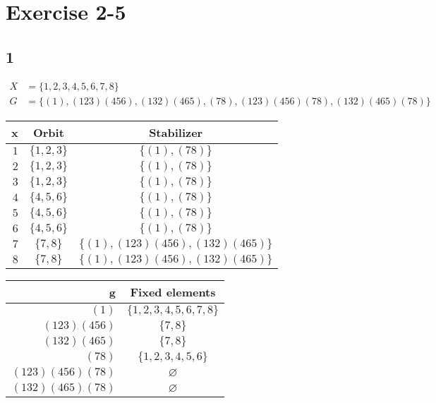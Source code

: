 \documentclass[draft]{article}
\begin{document}
	\section*{Exercise 2-5}
		\subsection*{1}
			\begin{equation*} 
				\begin{split}
					X &= \{ 1, 2, 3, 4, 5, 6, 7, 8 \}	\\
					G &= \{ (1), (123)(456), (132)(465), (78), (123)(456)(78), (132)(465)(78)\}
				\end{split}
			\end{equation*}
			\begin{center}
				\begin{tabular}{r | c | c}
					\hline
						x & Orbit & Stabilizer \\
					\hline 
						$ 1 $ & $\{ 1, 2, 3 \}$ & $\{ (1), (78) \}$ \\
						$ 2 $ & $\{ 1, 2, 3 \}$ & $\{ (1), (78) \}$ \\
						$ 3 $ & $\{ 1, 2, 3 \}$ & $\{ (1), (78) \}$ \\
						$ 4 $ & $\{ 4, 5, 6 \}$ & $\{ (1), (78) \}$ \\
						$ 5 $ & $\{ 4, 5, 6 \}$ & $\{ (1), (78) \}$ \\
						$ 6 $ & $\{ 4, 5, 6 \}$ & $\{ (1), (78) \}$ \\
						$ 7 $ & $\{ 7, 8 \}$ & $\{ (1), (123)(456), (132)(465) \}$ \\
						$ 8 $ & $\{ 7, 8 \}$ & $\{ (1), (123)(456), (132)(465) \}$ \\
					\hline
				\end{tabular}
			\end{center}
			\begin{center}
				\begin{tabular}{r | c}
					\hline
					g & Fixed elements \\
					\hline
					$(1)           $ & $\{1,2,3,4,5,6,7,8\}$\\
					$(123)(456)    $ & $\{7,8\}$\\
					$(132)(465)    $ & $\{7,8\}$\\
					$(78)          $ & $\{1,2,3,4,5,6\}$\\
					$(123)(456)(78)$ & $\varnothing$\\
					$(132)(465)(78)$ & $\varnothing$\\
					\hline
				\end{tabular}
			\end{center}
\end{document}
